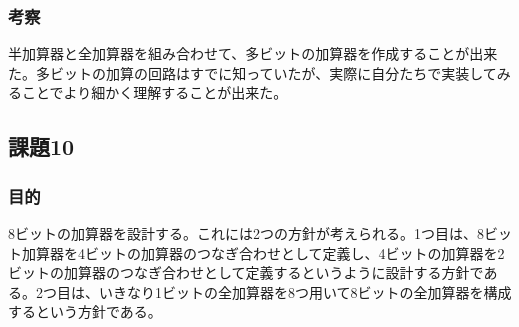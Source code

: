 \documentclass[a4paper]{jarticle}
\begin{document}
\subsubsection{考察}
半加算器と全加算器を組み合わせて、多ビットの加算器を作成することが出来た。多ビットの加算の回路はすでに知っていたが、実際に自分たちで実装してみることでより細かく理解することが出来た。

\subsection{課題10}
\subsubsection{目的}
8ビットの加算器を設計する。これには2つの方針が考えられる。1つ目は、8ビット加算器を4ビットの加算器のつなぎ合わせとして定義し、4ビットの加算器を2ビットの加算器のつなぎ合わせとして定義するというように設計する方針である。2つ目は、いきなり1ビットの全加算器を8つ用いて8ビットの全加算器を構成するという方針である。
\end{document}
